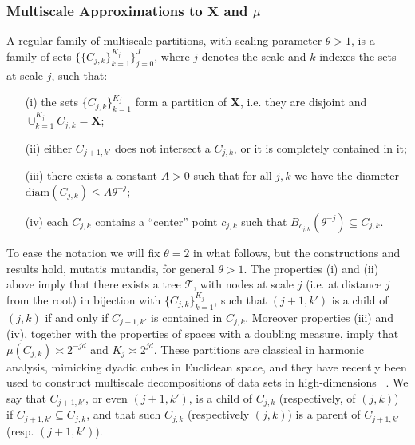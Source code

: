 \documentclass[twoside,11pt]{article}
\newcommand{\Xsp}{{\mathbf{X}}}
\begin{document}
\subsubsection{Multiscale Approximations to $\Xsp$ and $\mu$}
\label{sec:mspartitions}
A regular family of multiscale partitions, with scaling parameter $\theta>1$,
is a family of sets $\{\{C_{j,k}\}_{k=1}^{K_j}\}_{j=0}^J$, where $j$ denotes
the scale and $k$ indexes the sets at scale $j$, such that: 
\begin{itemize}
\item[(i)] the sets $\{C_{j,k}\}_{k=1}^{K_j}$ form a partition of ${\Xsp}$,
  i.e.  they are disjoint and $\cup_{k=1}^{K_j}C_{j,k} = {\Xsp}$;
\item[(ii)] either $C_{j+1,k'}$ does not intersect a $C_{j,k}$, or it is
  completely contained in it;
\item[(iii)] there exists a constant $A>0$ such that for all $j,k$ we have
  the diameter $\mathrm{diam}(C_{j,k})\le A\theta^{-j}$;
\item[(iv)] each $C_{j,k}$ contains a ``center'' point $c_{j,k}$ such that
  $B_{c_{j,k}}(\theta^{-j})\subseteq C_{j,k}$.
\end{itemize}
To ease the notation we will fix $\theta=2$ in what follows, but the
constructions and results hold, mutatis mutandis, for general $\theta>1$.  The
properties (i) and (ii) above imply that there exists a tree $\mathcal{T}$, with nodes at
scale $j$ (i.e. at distance $j$ from the root) in bijection with
$\{C_{j,k}\}_{k=1}^{K_j}$, such that $(j+1,k')$ is a child of $(j,k)$ if and
only if $C_{j+1,k'}$ is contained in $C_{j,k}$.  Moreover properties (iii) and
(iv), together with the properties of spaces with a doubling measure, imply
that $\mu(C_{j,k})\asymp 2^{-jd}$ and $K_j\asymp 2^{jd}$.  These partitions are
classical in harmonic analysis, mimicking dyadic cubes in Euclidean space, and
they have recently been used to construct multiscale decompositions of data
sets in high-dimensions ~\citep{LMR:MGM1,CM:MGM2,IM:GMRA_CS,6410789}.  We say
that $C_{j+1,k'}$, or even $(j+1,k')$, is a child of $C_{j,k}$ (respectively,
of $(j,k)$) if $C_{j+1,k'}\subseteq C_{j,k}$, and that such $C_{j,k}$
(respectively $(j,k)$) is a parent of $C_{j+1,k'}$ (resp.  $(j+1,k')$).
\end{document}

